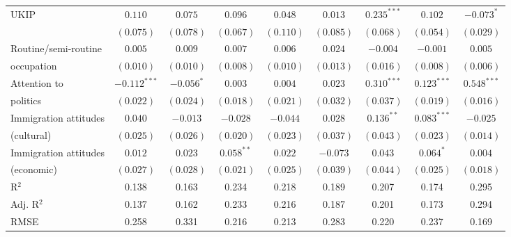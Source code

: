 \documentclass[12pt, letter]{article}
\begin{document}
\begin{table}
\begin{center}
{\begin{tabular}{l c c c c c c c c }
UKIP                             & $0.110$        & $0.075$        & $0.096$        & $0.048$        & $0.013$        & $0.235^{***}$  & $0.102$        & $-0.073^{*}$   \\
                                 & $(0.075)$      & $(0.078)$      & $(0.067)$      & $(0.110)$      & $(0.085)$      & $(0.068)$      & $(0.054)$      & $(0.029)$      \\
Routine/semi-routine   & $0.005$        & $0.009$        & $0.007$        & $0.006$        & $0.024$        & $-0.004$       & $-0.001$       & $0.005$        \\
occupation                         & $(0.010)$      & $(0.010)$      & $(0.008)$      & $(0.010)$      & $(0.013)$      & $(0.016)$      & $(0.008)$      & $(0.006)$      \\
Attention to             & $-0.112^{***}$ & $-0.056^{*}$   & $0.003$        & $0.004$        & $0.023$        & $0.310^{***}$  & $0.123^{***}$  & $0.548^{***}$  \\
politics                         & $(0.022)$      & $(0.024)$      & $(0.018)$      & $(0.021)$      & $(0.032)$      & $(0.037)$      & $(0.019)$      & $(0.016)$      \\
Immigration attitudes & $0.040$        & $-0.013$       & $-0.028$       & $-0.044$       & $0.028$        & $0.136^{**}$   & $0.083^{***}$  & $-0.025$       \\
           (cultural)                        & $(0.025)$      & $(0.026)$      & $(0.020)$      & $(0.023)$      & $(0.037)$      & $(0.043)$      & $(0.023)$      & $(0.014)$      \\
Immigration attitudes & $0.012$        & $0.023$        & $0.058^{**}$   & $0.022$        & $-0.073$       & $0.043$        & $0.064^{*}$    & $0.004$        \\
           (economic)                       & $(0.027)$      & $(0.028)$      & $(0.021)$      & $(0.025)$      & $(0.039)$      & $(0.044)$      & $(0.025)$      & $(0.018)$      \\
\hline
R$^2$                            & 0.138          & 0.163          & 0.234          & 0.218          & 0.189          & 0.207          & 0.174          & 0.295          \\
Adj. R$^2$                       & 0.137          & 0.162          & 0.233          & 0.216          & 0.187          & 0.201          & 0.173          & 0.294          \\
RMSE                             & 0.258          & 0.331          & 0.216          & 0.213          & 0.283          & 0.220          & 0.237          & 0.169          \\

\end{tabular}}
\end{center}
\end{table}
\end{document}
